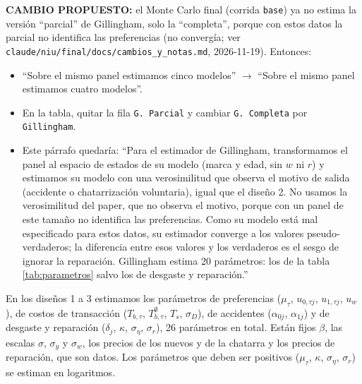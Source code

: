 \documentclass{article}
\begin{document}
{\color{red}\textbf{CAMBIO PROPUESTO:} el Monte Carlo final (corrida \texttt{base}) ya no estima la versión ``parcial'' de Gillingham, solo la ``completa'', porque con estos datos la parcial no identifica las preferencias (no convergía; ver \texttt{claude/niu/final/docs/cambios\_y\_notas.md}, 2026-11-19). Entonces:
\begin{itemize}
\item ``Sobre el mismo panel estimamos cinco modelos'' $\to$ ``Sobre el mismo panel estimamos cuatro modelos''.
\item En la tabla, quitar la fila \texttt{G. Parcial} y cambiar \texttt{G. Completa} por \texttt{Gillingham}.
\item Este párrafo quedaría: ``Para el estimador de Gillingham, transformamos el panel al espacio de estados de su modelo (marca y edad, sin $w$ ni $r$) y estimamos su modelo con una verosimilitud que observa el motivo de salida (accidente o chatarrización voluntaria), igual que el diseño 2. No usamos la verosimilitud del paper, que no observa el motivo, porque con un panel de este tamaño no identifica las preferencias. Como su modelo está mal especificado para estos datos, su estimador converge a los valores pseudo-verdaderos; la diferencia entre esos valores y los verdaderos es el sesgo de ignorar la reparación. Gillingham estima 20 parámetros: los de la tabla \ref{tab:parametros} salvo los de desgaste y reparación.''
\end{itemize}}

En los diseños 1 a 3 estimamos los parámetros de preferencias ($\mu_\tau$, $u_{0,\tau j}$, $u_{1,\tau j}$, $u_w$), de costos de transacción ($T_{b,\tau}$, $T^{\emptyset}_{b,\tau}$, $T_s$, $\sigma_D$), de accidentes ($\alpha_{0j}$, $\alpha_{1j}$) y de desgaste y reparación ($\delta_j$, $\kappa$, $\sigma_\eta$, $\sigma_r$), 26 parámetros en total. Están fijos $\beta$, las escalas $\sigma$, $\sigma_y$ y $\sigma_w$, los precios de los nuevos y de la chatarra y los precios de reparación, que son datos. Los parámetros que deben ser positivos ($\mu_\tau$, $\kappa$, $\sigma_\eta$, $\sigma_r$) se estiman en logaritmos.

\end{document}
